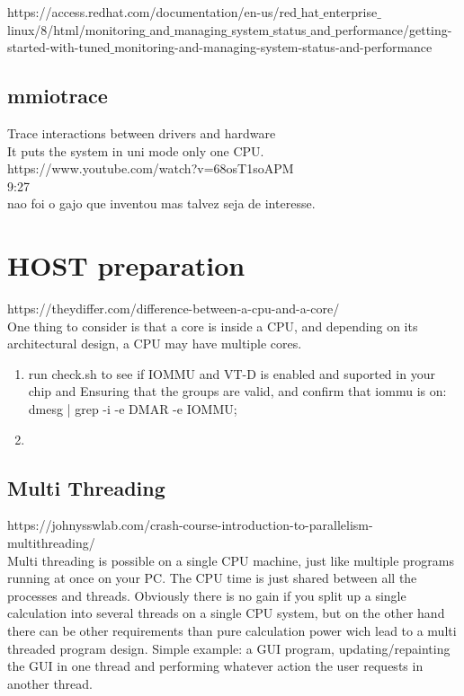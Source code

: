 \documentclass[11pt, a4paper, oneside]{article}
\theoremstyle{definition}
\begin{document}
https://access.redhat.com/documentation/en-us/red$\_$hat$\_$enterprise$\_$linux/8/html/monitoring$\_$and$\_$managing$\_$system$\_$status$\_$and$\_$performance/getting-started-with-tuned$\_$monitoring-and-managing-system-status-and-performance\\


\vfill
\pagebreak
\subsection{mmiotrace}

Trace interactions between drivers and hardware\\
It puts the system in uni mode only one CPU.\\

https://www.youtube.com/watch?v=68osT1soAPM\\
9:27\\
nao foi o gajo que inventou mas talvez seja de interesse.\\

\vfill
\pagebreak


\vfill
\pagebreak
\section{HOST preparation}
https://theydiffer.com/difference-between-a-cpu-and-a-core/\\
One thing to consider is that a core is inside a CPU, and depending on its architectural design, a CPU may have multiple cores.\\

\begin{enumerate}
	\item run check.sh to see if IOMMU and VT-D is enabled and suported in your chip and Ensuring that the groups are valid, and confirm that iommu is on: dmesg | grep -i -e DMAR -e IOMMU;
	\item 
\end{enumerate}
\subsection{Multi Threading}
https://johnysswlab.com/crash-course-introduction-to-parallelism-multithreading/\\
Multi threading is possible on a single CPU machine, just like multiple programs running at once on your PC. The CPU time is just shared between all the processes and threads. Obviously there is no gain if you split up a single calculation into several threads on a single CPU system, but on the other hand there can be other requirements than pure calculation power wich lead to a multi threaded program design. Simple example: a GUI program, updating/repainting the GUI in one thread and performing whatever action the user requests in another thread.\\
\end{document}

